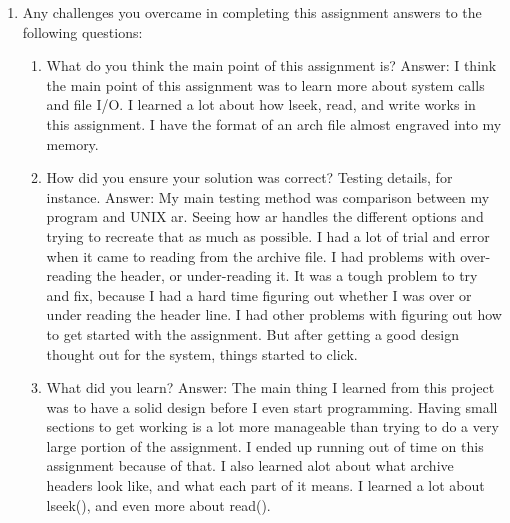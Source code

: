\documentclass[letterpaper,10pt,titlepage]{article}
\begin{document}
\begin{enumerate}
	\item Any challenges you overcame in completing this assignment answers
to the following questions:
		\begin{enumerate}
			\item What do you think the main point of this
assignment is? Answer: I think the main point of this assignment was to learn
more about system calls and file I/O. I learned a lot about how lseek, read, and
write works in this assignment. I have the format of an arch file almost
engraved into my memory.
			\item How did you ensure your solution was correct?
Testing details, for instance. Answer: My main testing method was comparison
between my program and UNIX ar. Seeing how ar handles the different options and
trying to recreate that as much as possible. I had a lot of trial and error when
it came to reading from the archive file. I had problems with over-reading the
header, or under-reading it. It was a tough problem to try and fix, because I
had a hard time figuring out whether I was over or under reading the header
line. I had other problems with figuring out how to get started with the
assignment. But after getting a good design thought out for the system, things
started to click.
			\item What did you learn? Answer: The main thing I
learned from this project was to have a solid design before I even start
programming. Having small sections to get working is a lot more manageable than
trying to do a very large portion of the assignment. I ended up running out of
time on this assignment because of that. I also learned alot about what archive
headers look like, and what each part of it means. I learned a lot about lseek(),
and even more about read().
		\end{enumerate}

\end{enumerate}
\end{document}
